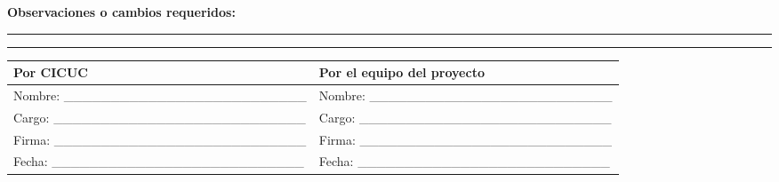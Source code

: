 \documentclass[
]{article}
\begin{document}
\textbf{Observaciones o cambios requeridos:}

\begin{center}\rule{0.5\linewidth}{0.5pt}\end{center}

\begin{center}\rule{0.5\linewidth}{0.5pt}\end{center}

\begin{longtable}[]{@{}ll@{}}
\toprule\noalign{}
Por CICUC & Por el equipo del proyecto \\
\midrule\noalign{}
\endhead
\bottomrule\noalign{}
\endlastfoot
Nombre: \_\_\_\_\_\_\_\_\_\_\_\_\_\_\_\_\_\_\_\_\_\_\_\_\_\_ & Nombre:
\_\_\_\_\_\_\_\_\_\_\_\_\_\_\_\_\_\_\_\_\_\_\_\_\_\_ \\
Cargo: \_\_\_\_\_\_\_\_\_\_\_\_\_\_\_\_\_\_\_\_\_\_\_\_\_\_\_ & Cargo:
\_\_\_\_\_\_\_\_\_\_\_\_\_\_\_\_\_\_\_\_\_\_\_\_\_\_\_ \\
Firma: \_\_\_\_\_\_\_\_\_\_\_\_\_\_\_\_\_\_\_\_\_\_\_\_\_\_\_ & Firma:
\_\_\_\_\_\_\_\_\_\_\_\_\_\_\_\_\_\_\_\_\_\_\_\_\_\_\_ \\
Fecha: \_\_\_\_\_\_\_\_\_\_\_\_\_\_\_\_\_\_\_\_\_\_\_\_\_\_\_ & Fecha:
\_\_\_\_\_\_\_\_\_\_\_\_\_\_\_\_\_\_\_\_\_\_\_\_\_\_\_ \\
\end{longtable}
\end{document}
